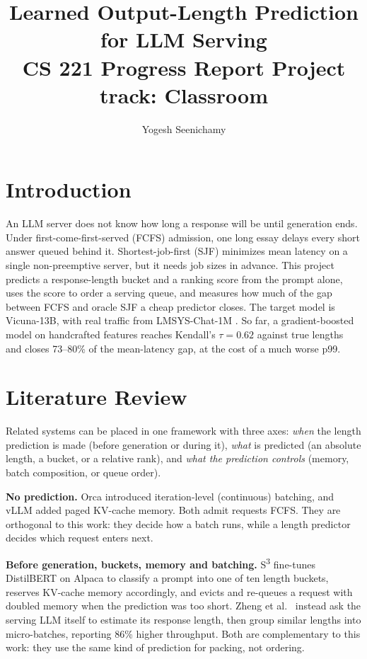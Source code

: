 \documentclass[10pt,twocolumn]{article}
\title{\vspace{-1.5em}Learned Output-Length Prediction for LLM Serving\\[2pt]\large CS 221 Progress Report \textbullet{} Project track: Classroom}
\author{Yogesh Seenichamy}
\date{}
\begin{document}
\maketitle
\vspace{-1.5em}

\section{Introduction}
An LLM server does not know how long a response will be until generation ends. Under first-come-first-served (FCFS) admission, one long essay delays every short answer queued behind it. Shortest-job-first (SJF) minimizes mean latency on a single non-preemptive server, but it needs job sizes in advance. This project predicts a response-length bucket and a ranking score from the prompt alone, uses the score to order a serving queue, and measures how much of the gap between FCFS and oracle SJF a cheap predictor closes. The target model is Vicuna-13B, with real traffic from LMSYS-Chat-1M \cite{lmsys1m}. So far, a gradient-boosted model on handcrafted features reaches Kendall's $\tau = 0.62$ against true lengths and closes 73--80\% of the mean-latency gap, at the cost of a much worse p99.

\section{Literature Review}
Related systems can be placed in one framework with three axes: \emph{when} the length prediction is made (before generation or during it), \emph{what} is predicted (an absolute length, a bucket, or a relative rank), and \emph{what the prediction controls} (memory, batch composition, or queue order).

\textbf{No prediction.} Orca \cite{orca} introduced iteration-level (continuous) batching, and vLLM \cite{vllm} added paged KV-cache memory. Both admit requests FCFS. They are orthogonal to this work: they decide how a batch runs, while a length predictor decides which request enters next.

\textbf{Before generation, buckets, memory and batching.} S\textsuperscript{3} \cite{s3} fine-tunes DistilBERT on Alpaca to classify a prompt into one of ten length buckets, reserves KV-cache memory accordingly, and evicts and re-queues a request with doubled memory when the prediction was too short. Zheng et al.\ \cite{zheng2023perception} instead ask the serving LLM itself to estimate its response length, then group similar lengths into micro-batches, reporting 86\% higher throughput. Both are complementary to this work: they use the same kind of prediction for packing, not ordering.
\end{document}
